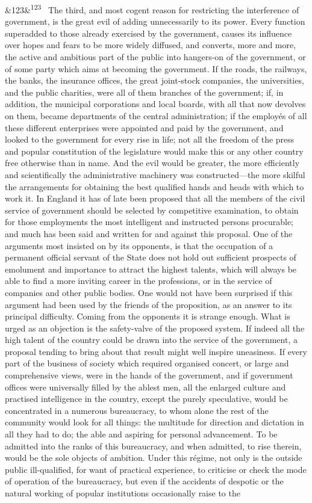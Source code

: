 \documentclass[12pt]{article}
\newcommand{\para}[1][]{\par\noindent\ifx&#1&\else\textsuperscript{\footnotesize #1}~\fi}
\begin{document}
\para[123] The third, and most cogent reason for restricting the interference of government, is the great evil of adding unnecessarily to its power. Every function superadded to those already exercised by the government, causes its influence over hopes and fears to be more widely diffused, and converts, more and more, the active and ambitious part of the public into hangers-on of the government, or of some party which aims at becoming the government. If the roads, the railways, the banks, the insurance offices, the great joint-stock companies, the universities, and the public charities, were all of them branches of the government; if, in addition, the municipal corporations and local boards, with all that now devolves on them, became departments of the central administration; if the employés of all these different enterprises were appointed and paid by the government, and looked to the government for every rise in life; not all the freedom of the press and popular constitution of the legislature would make this or any other country free otherwise than in name. And the evil would be greater, the more efficiently and scientifically the administrative machinery was constructed---the more skilful the arrangements for obtaining the best qualified hands and heads with which to work it. In England it has of late been proposed that all the members of the civil service of government should be selected by competitive examination, to obtain for those employments the most intelligent and instructed persons procurable; and much has been said and written for and against this proposal. One of the arguments most insisted on by its opponents, is that the occupation of a permanent official servant of the State does not hold out sufficient prospects of emolument and importance to attract the highest talents, which will always be able to find a more inviting career in the professions, or in the service of companies and other public bodies. One would not have been surprised if this argument had been used by the friends of the proposition, as an answer to its principal difficulty. Coming from the opponents it is strange enough. What is urged as an objection is the safety-valve of the proposed system. If indeed all the high talent of the country could be drawn into the service of the government, a proposal tending to bring about that result might well inspire uneasiness. If every part of the business of society which required organised concert, or large and comprehensive views, were in the hands of the government, and if government offices were universally filled by the ablest men, all the enlarged culture and practised intelligence in the country, except the purely speculative, would be concentrated in a numerous bureaucracy, to whom alone the rest of the community would look for all things: the multitude for direction and dictation in all they had to do; the able and aspiring for personal advancement. To be admitted into the ranks of this bureaucracy, and when admitted, to rise therein, would be the sole objects of ambition. Under this régime, not only is the outside public ill-qualified, for want of practical experience, to criticise or check the mode of operation of the bureaucracy, but even if the accidents of despotic or the natural working of popular institutions occasionally raise to the 
\end{document}
